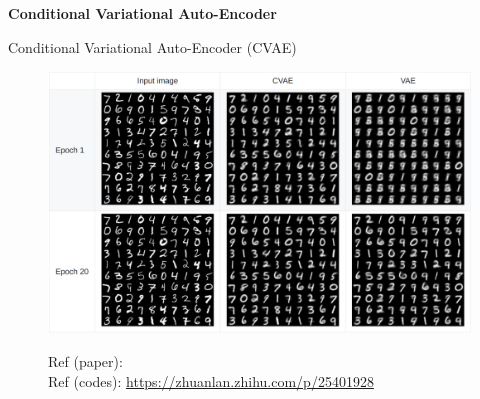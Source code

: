 \documentclass{beamer}
\begin{document}
{%
\begin{frame}
\begin{center}
{\bf\LARGE Conditional Variational Auto-Encoder}
\end{center}
\end{frame}
}%
\begin{frame}{Conditional Variational Auto-Encoder (CVAE)}
\begin{figure}
\includegraphics[width=.9\columnwidth]{fig/vs_vae.png}
\begin{spacing}{1}
\textcolor[RGB]{185 181 205}{\small
Ref (paper): \citet[Semi-S L with Deep Generative Models]{kingma5298semi}\\
Ref (codes): \url{https://zhuanlan.zhihu.com/p/25401928}
}
\end{spacing}
\end{figure}
\end{frame}
\end{document}

